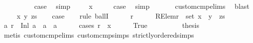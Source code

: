 \begin{isabellebody}
\ \ \isamarkupfalse%
\ {}\isanewline
\ \ \isamarkupfalse%
\ \isamarkupfalse%
\ {\isacharquery}{\kern0pt}case\ \isamarkupfalse%
\ simp\isanewline
{}\isamarkupfalse%
\isanewline
\ \ \isamarkupfalse%
\ {\isacharparenleft}{\kern0pt}{}\ x{\isacharparenright}{\kern0pt}\isanewline
\ \ \isamarkupfalse%
\ \isamarkupfalse%
\ {\isacharquery}{\kern0pt}case\ \isamarkupfalse%
\ simp\ \isanewline
\ \ \ \ \isamarkupfalse%
\ custom{\isacharunderscore}{\kern0pt}cmp{\isachardot}{\kern0pt}elims{\isacharparenleft}{\kern0pt}{}{\isacharparenright}{\kern0pt}\ \isamarkupfalse%
\ blast\isanewline
{}\isamarkupfalse%
\isanewline
\ \ \isamarkupfalse%
\ {\isacharparenleft}{\kern0pt}{}\ x\ y\ zs{\isacharparenright}{\kern0pt}\isanewline
\ \ \isamarkupfalse%
\ {\isacharquery}{\kern0pt}case\isanewline
\ \ \isamarkupfalse%
\ {\isacharparenleft}{\kern0pt}rule\ ballI{\isacharparenright}{\kern0pt}\isanewline
\ \ \ \ \isamarkupfalse%
\ r\isanewline
\ \ \ \ \isamarkupfalse%
\ RElem{\isacharcolon}{\kern0pt}{\isachardoublequoteopen}r\ {\isasymin}\ set\ {\isacharparenleft}{\kern0pt}x\ {\isacharhash}{\kern0pt}\ y\ {\isacharhash}{\kern0pt}\ zs{\isacharparenright}{\kern0pt}{\isachardoublequoteclose}\isanewline
\ \ \ \ \isamarkupfalse%
\ {\isachardoublequoteopen}{\isasymexists}a{\isacharprime}{\kern0pt}{\isachardot}{\kern0pt}\ r\ {\isacharequal}{\kern0pt}\ Inl\ a{\isacharprime}{\kern0pt}\ {\isasymand}\ a\ {\isacharless}{\kern0pt}\ a{\isacharprime}{\kern0pt}{\isachardoublequoteclose}\isanewline
\ \ \ \ \isamarkupfalse%
\ {\isacharparenleft}{\kern0pt}cases\ {\isachardoublequoteopen}r\ {\isacharequal}{\kern0pt}\ x{\isachardoublequoteclose}{\isacharparenright}{\kern0pt}\isanewline
\ \ \ \ \isamarkupfalse%
\ True\isanewline
\ \ \ \ \ \ \isamarkupfalse%
\ \isamarkupfalse%
\ {\isacharquery}{\kern0pt}thesis\ \isamarkupfalse%
\ {}\ \isanewline
\ \ \ \ \ \ \ \ \isamarkupfalse%
\ {\isacharparenleft}{\kern0pt}metis\ custom{\isacharunderscore}{\kern0pt}cmp{\isachardot}{\kern0pt}elims{\isacharparenleft}{\kern0pt}{}{\isacharparenright}{\kern0pt}\ custom{\isacharunderscore}{\kern0pt}cmp{\isachardot}{\kern0pt}simps{\isacharparenleft}{\kern0pt}{}{\isacharparenright}{\kern0pt}\ strictly{\isacharunderscore}{\kern0pt}ordered{\isachardot}{\kern0pt}simps{\isacharparenleft}{\kern0pt}{}{\isacharparenright}{\kern0pt}{\isacharparenright}{\kern0pt}\isanewline

\end{isabellebody}
